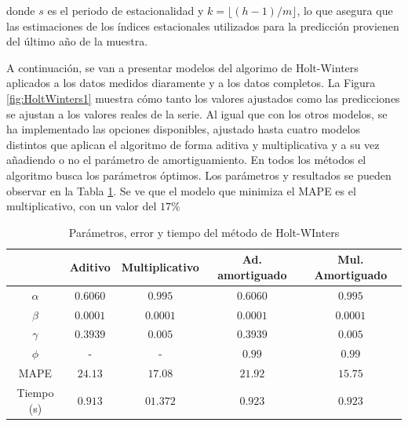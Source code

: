 \documentclass[12pt,twoside]{article}
\begin{document}
donde $s$ es el periodo de estacionalidad y  $k = \lfloor (h-1)/m \rfloor$, lo que asegura que las estimaciones de los índices estacionales utilizados para la predicción provienen del último año de la muestra.

A continuación, se van a presentar modelos del algorimo de Holt-Winters aplicados a los datos medidos diaramente y a los datos completos. La Figura \ref{fig:HoltWinters1} muestra cómo tanto los valores ajustados como las predicciones se ajustan a los valores reales de la serie. Al igual que con los otros modelos, se ha implementado las opciones disponibles, ajustado hasta cuatro modelos distintos que aplican el algoritmo de forma aditiva y multiplicativa y a su vez añadiendo o no el parámetro de amortiguamiento. En todos los métodos el algoritmo busca los parámetros óptimos. Los parámetros y resultados se pueden observar en la Tabla \ref{tab:holtwinters}. Se ve que el modelo que minimiza el MAPE es el multiplicativo, con un valor del $17\%$


\begin{table}[h] 
\centering
\begin{tabular}{ccccc}  \hline
     & Aditivo & Multiplicativo & Ad. amortiguado & Mul. Amortiguado  \\ \hline
    $\alpha$ &  $0.6060$ &   $0.995$  &  $0.6060$ &   $0.995$ \\ 
    $\beta$  &  $0.0001$ &   $0.0001$ &  $0.0001$ &  $0.0001$ \\ 
    $\gamma$ &  $0.3939$ & 	 $0.005$  &	 $0.3939$ &   $0.005$ \\
    $\phi$   &     -     &       -    &    $0.99$ &    $0.99$ \\ 
      MAPE   &   $24.13$ &   $17.08$ &   $21.92$  &  $15.75$  \\
      Tiempo (s) & $0.913$ &   $01.372$	 &  $0.923$ & $0.923$\\ \hline
\end{tabular}
\caption{Parámetros, error y tiempo del método de Holt-WInters} \label{tab:holtwinters}
\end{table}
\end{document}
